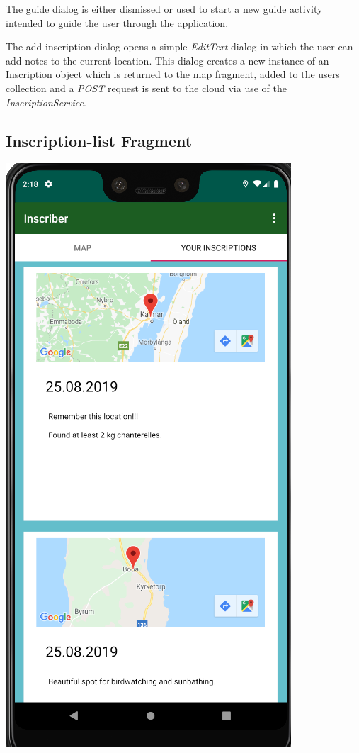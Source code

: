 \documentclass[]{article}
\begin{document}
\begin{flushleft}
The guide dialog is either dismissed or used to start a new guide activity intended to guide the user through the application.\medskip

The add inscription dialog opens a simple \textit{EditText} dialog in which the user can add notes to the current location. This dialog creates a new instance of an Inscription object which is returned to the map fragment, added to the users collection and a \textit{POST} request is sent to the cloud via use of the \textit{InscriptionService}.

\newpage
\left\subsection{Inscription-list Fragment}

\begin{floatingfigure}[r]{0.3\linewidth}
	\includegraphics[scale=0.4]{inscription.png}

\end{floatingfigure}
\end{flushleft}
\end{document}
